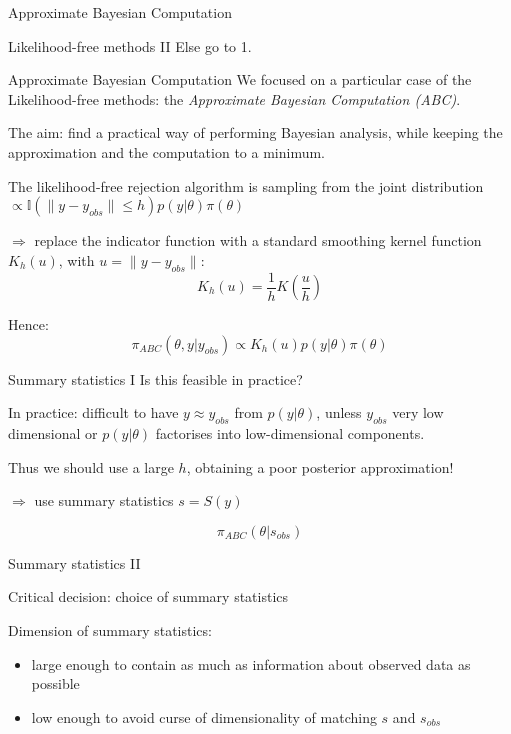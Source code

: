 \documentclass{beamer}
\begin{document}
\begin{section}{Approximate Bayesian Computation}
\begin{frame}{Likelihood-free methods II}
		\vspace{0.2cm}
		Else go to 1. 
	\end{frame}

	\begin{frame}{Approximate Bayesian Computation}
		We focused on a particular case of the Likelihood-free methods: the \emph{Approximate Bayesian Computation (ABC)}.
		
		\vspace{0.5cm}
		
		The aim: find a practical way of performing Bayesian analysis, while keeping the approximation and the computation to a minimum.
		
		\vspace{0.5cm}
		The likelihood-free rejection algorithm is sampling from the joint distribution $\propto \mathbb{I}(\parallel y-y_{obs} \parallel \leq h)p(y|\theta)\pi(\theta)$
		
	
		$\Longrightarrow$ replace the indicator function with a standard smoothing kernel function $K_h(u)$, with $u=\parallel y-y_{obs} \parallel$:
		\[ K_h(u)  =  \frac{1}{h}  K  ( \frac{u}{h} )  \]
		
		
		\vspace{0.2cm}
		Hence:
		\[\pi_{ABC}(\theta, y | y_{obs}) \propto K_h(u)p(y|\theta)\pi(\theta)\]

	\end{frame}

	\begin{frame}{Summary statistics I}
		Is this feasible in practice?
		
		\vspace{0.5cm}
		In practice: difficult to have $y\approx y_{obs}$ from $p(y|\theta)$, unless $y_{obs}$ very low dimensional or $p(y|\theta)$ factorises into low-dimensional components.
		
		Thus we should use a large $h$, obtaining a poor posterior approximation!
		
		$\Longrightarrow$ use summary statistics $s = S(y)$
		
		\[  \pi_{ABC} (\theta | s_{obs})   \]
	\end{frame}
		
	\begin{frame}{Summary statistics II}
		
		Critical decision: choice of summary statistics
		
		\vspace{0.3cm}
		Dimension of summary statistics:
		\begin{itemize}
			\item large enough to contain as much as information about observed data as possible
			\item low enough to avoid curse of dimensionality of matching $s$ and $s_{obs}$
		\end{itemize}
		

\end{frame}
\end{section}
\end{document}
